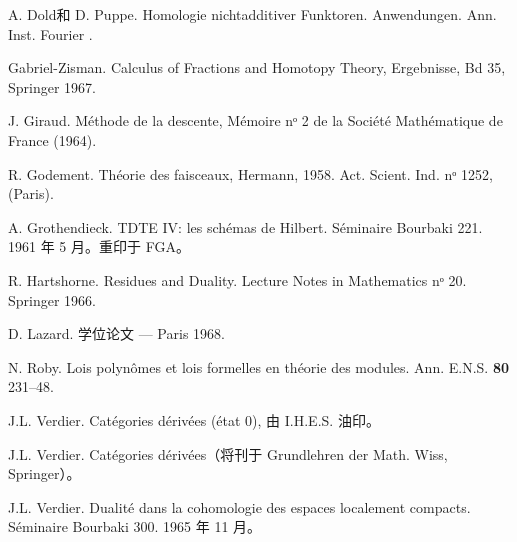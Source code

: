\begin{thebibliography}{}
 A. Dold\pageoriginale 和 D. Puppe. Homologie nicht\sisi{ }{-}additiver
Funktoren. Anwendungen. Ann. Inst. Fourier .

 Gabriel-Zisman. Calculus of Fractions and Homotopy
Theory, Ergebnisse, Bd 35, Springer 1967.

 J. Giraud. Méthode de la descente, Mémoire nᵒ 2 de la Société Mathématique de France (1964).

 R. Godement. Théorie des faisceaux, Hermann,
1958. Act. Scient. Ind. nᵒ 1252, (Paris).

 A. Grothendieck. TDTE IV: les schémas de
Hilbert. Séminaire Bourbaki 221. 1961 年 5 月。重印于 FGA。

 R. Hartshorne. Residues and Duality. Lecture Notes
in Mathematics nᵒ 20. Springer 1966.

 D. Lazard. 学位论文 --- Paris 1968.



 N. Roby. Lois polynômes et lois formelles en théorie
des modules. Ann. E.N.S. \textbf{80} 231--48.

 J.L. Verdier. Catégories dérivées (état 0),
由 I.H.E.S. 油印。

 J.L. Verdier. Catégories dérivées（将刊于
Grundlehren der Math. Wiss, Springer）。

 J.L. Verdier. Dualité dans la cohomologie des
espaces localement compacts. Séminaire Bourbaki 300. 1965 年 11 月。
\end{thebibliography}


